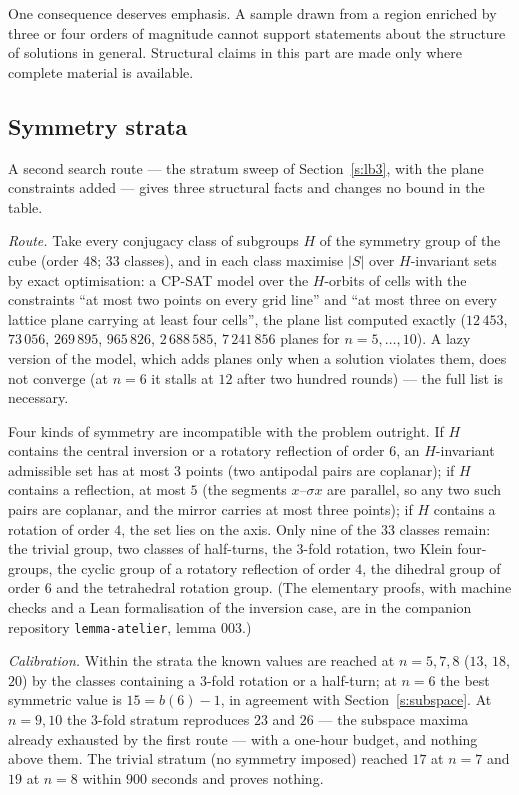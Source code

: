 \documentclass[11pt,a4paper]{article}
\begin{document}
One consequence deserves emphasis.  A sample drawn from a region enriched by three or four orders
of magnitude cannot support statements about the structure of solutions in general.  Structural
claims in this part are made only where complete material is available.

\subsection{Symmetry strata}\label{s:strata4}
A second search route --- the stratum sweep of Section~\ref{s:lb3}, with the plane constraints added --- gives three structural
facts and changes no bound in the table.

\emph{Route.}  Take every conjugacy class of subgroups $H$
of the symmetry group of the cube (order $48$; $33$ classes), and in each class maximise $|S|$
over $H$-invariant sets by exact optimisation: a CP-SAT model over the $H$-orbits of cells with the
constraints ``at most two points on every grid line'' and ``at most three on every lattice plane
carrying at least four cells'', the plane list computed exactly ($12\,453$, $73\,056$, $269\,895$,
$965\,826$, $2\,688\,585$, $7\,241\,856$ planes for $n=5,\dots,10$).  A lazy version of the model,
which adds planes only when a solution violates them, does not converge (at $n=6$ it stalls at $12$
after two hundred rounds) --- the full list is necessary.

Four kinds of symmetry are incompatible with the problem outright.  If $H$ contains the central
inversion or a rotatory reflection of order $6$, an $H$-invariant admissible set has at most $3$
points (two antipodal pairs are coplanar); if $H$ contains a reflection, at most $5$ (the segments
$x$--$\sigma x$ are parallel, so any two such pairs are coplanar, and the mirror carries at most
three points); if $H$ contains a rotation of order $4$, the set lies on the axis.  Only nine of the
$33$ classes remain: the trivial group, two classes of half-turns, the $3$-fold rotation, two
Klein four-groups, the cyclic group of a rotatory reflection of order $4$, the dihedral group
of order $6$ and the tetrahedral rotation group.  (The elementary proofs, with machine checks
and a Lean formalisation of the inversion case, are in the companion repository
\texttt{lemma-atelier}, lemma 003.)

\emph{Calibration.}  Within the strata the known values are reached at $n=5,7,8$ ($13$, $18$,
$20$) by the classes containing a $3$-fold rotation or a half-turn; at $n=6$ the best symmetric
value is $15=b(6)-1$, in agreement with Section~\ref{s:subspace}.  At $n=9,10$ the $3$-fold
stratum reproduces $23$ and $26$ --- the subspace maxima already exhausted by the first route ---
with a one-hour budget, and nothing above them.  The trivial stratum (no symmetry imposed)
reached $17$ at $n=7$ and $19$ at $n=8$ within $900$ seconds and proves nothing.
\end{document}
